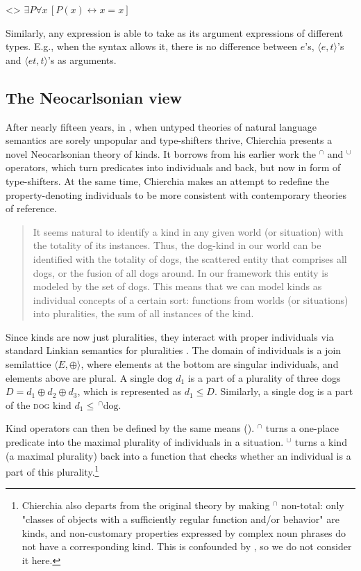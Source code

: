 \documentclass[a4paper, 12pt]{article}
\begin{document}
\ex<>
    $\exists P\forall x\,[P(x) \leftrightarrow x=x]$
\xe

Similarly, any expression is able to take as its argument expressions of different types. E.g., when the syntax allows it, there is no difference between $e$'s, $\langle e,t\rangle$'s and $\langle et,t\rangle$'s as arguments. 

\subsection{The Neocarlsonian view}\label{neocar}

After nearly fifteen years, in \citeyear{chierchia1998referencekindslanguages}, when untyped theories of natural language semantics are sorely unpopular and type-shifters thrive, Chierchia presents a novel Neocarlsonian theory of kinds. It borrows from his earlier work the $^\cap $ and $^\cup $ operators, which turn predicates into individuals and back, but now in form of type-shifters. At the same time, Chierchia makes an attempt to redefine the property-denoting individuals to be more consistent with contemporary theories of reference.

\begin{quote}
    It seems natural to identify a kind in any given world (or situation) with the totality of its instances. Thus, the dog-kind in our world can be identified with the totality of dogs, the scattered entity that comprises all dogs, or the fusion of all dogs around. In our framework this entity is modeled by the set of dogs. This means that we can model kinds as individual concepts of a certain sort: functions from worlds (or situations) into pluralities, the sum of all instances of the kind.\hfill\parencite[349]{chierchia1998referencekindslanguages}
\end{quote}

Since kinds are now just pluralities, they interact with proper individuals via standard Linkian semantics for pluralities \parencite{link1983logicalanalysisplurals}. The domain of individuals is a join semilattice $\langle E,\oplus\rangle$, where elements at the bottom are singular individuals, and elements above are plural. A single dog $d_1$ is a part of a plurality of three dogs $D=d_1\oplus d_2\oplus d_3$, which is represented as $d_1\le D$. Similarly, a single dog is a part of the \textsc{dog} kind $d_1\le\,^\cap \text{dog}$.

Kind operators can then be defined by the same means (\nextx). $^\cap $ turns a one-place predicate into the maximal plurality of individuals in a situation. $^\cup $ turns a kind (a maximal plurality) back into a function that checks whether an individual is a part of this plurality.\footnote{Chierchia also departs from the original theory by making $^\cap $ non-total: only "classes of objects with a sufficiently regular function and/or behavior" are kinds, and non-customary properties expressed by complex noun phrases do not have a corresponding kind. This is confounded by \parencite{mendia2019referenceadhoc}, so we do not consider it here.}
\end{document}

